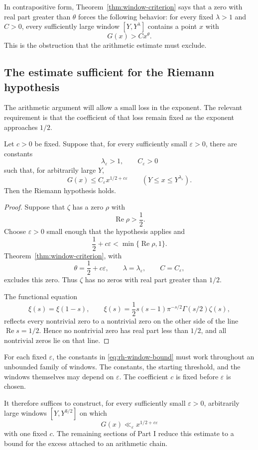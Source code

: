 In contrapositive form, Theorem~\ref{thm:window-criterion} says that a zero with real part greater than $\theta$ forces the following behavior: for every fixed $\lambda>1$ and $C>0$, every sufficiently large window $[Y,Y^\lambda]$ contains a point $x$ with
\[
G(x)>Cx^\theta.
\]
This is the obstruction that the arithmetic estimate must exclude.

\subsection{The estimate sufficient for the Riemann hypothesis}\label{subsec:rh-estimate}

The arithmetic argument will allow a small loss in the exponent. The relevant requirement is that the coefficient of that loss remain fixed as the exponent approaches $1/2$.

\begin{corollary}\label{thm:rh-criterion}
Let $c>0$ be fixed. Suppose that, for every sufficiently small $\varepsilon>0$, there are constants
\[
\lambda_\varepsilon>1,
\qquad
C_\varepsilon>0
\]
such that, for arbitrarily large $Y$,
\begin{equation}\label{eq:rh-window-bound}
G(x)
\leq
C_\varepsilon x^{1/2+c\varepsilon}
\qquad
(Y\leq x\leq Y^{\lambda_\varepsilon}).
\end{equation}
Then the Riemann hypothesis holds.
\end{corollary}

\begin{proof}
Suppose that $\zeta$ has a zero $\rho$ with
\[
\operatorname{Re}\rho>\frac12.
\]
Choose $\varepsilon>0$ small enough that the hypothesis applies and
\[
\frac12+c\varepsilon
<
\min\{\operatorname{Re}\rho,1\}.
\]
Theorem~\ref{thm:window-criterion}, with
\[
\theta=\frac12+c\varepsilon,
\qquad
\lambda=\lambda_\varepsilon,
\qquad
C=C_\varepsilon,
\]
excludes this zero. Thus $\zeta$ has no zeros with real part greater than $1/2$.

The functional equation~\cite[Eqs.~(25.4.3)--(25.4.4)]{dlmf-zeta}
\[
\xi(s)=\xi(1-s),
\qquad
\xi(s)=\frac12s(s-1)\pi^{-s/2}\Gamma(s/2)\zeta(s),
\]
reflects every nontrivial zero to a nontrivial zero on the other side of the line $\operatorname{Re}s=1/2$. Hence no nontrivial zero has real part less than $1/2$, and all nontrivial zeros lie on that line.
\end{proof}

For each fixed $\varepsilon$, the constants in \eqref{eq:rh-window-bound} must work throughout an unbounded family of windows. The constants, the starting threshold, and the windows themselves may depend on $\varepsilon$. The coefficient $c$ is fixed before $\varepsilon$ is chosen.

It therefore suffices to construct, for every sufficiently small $\varepsilon>0$, arbitrarily large windows $[Y,Y^{3/2}]$ on which
\[
G(x)\ll_\varepsilon x^{1/2+c\varepsilon}
\]
with one fixed $c$. The remaining sections of Part I reduce this estimate to a bound for the excess attached to an arithmetic chain.
